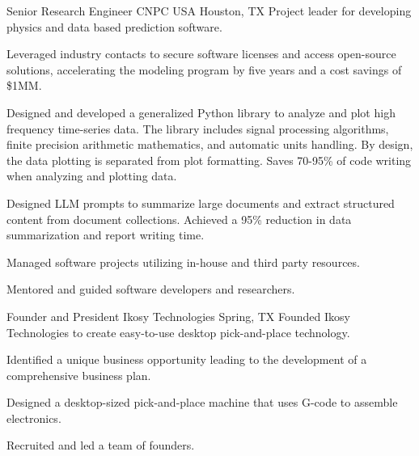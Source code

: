 \documentclass{leresume}
\begin{document}
            {Senior Research Engineer}
            {CNPC USA}
			{Houston, TX}
			Project leader for developing physics and data based prediction software.
		\begin{bulletedlist}
			
		\item
		
				Leveraged industry contacts to secure software licenses and access open-source solutions, accelerating the modeling program by five years and a cost savings of \$1MM.
			
		\item
		
				Designed and developed a generalized Python library to analyze and plot high frequency time-series data.  The library includes signal processing algorithms, 
				finite precision arithmetic mathematics, and automatic units handling. By design, the data plotting is separated from plot formatting.  Saves 70-95\% of code writing when analyzing and plotting data.
			
		\item
		
				Designed LLM prompts to summarize large documents and extract structured content from document collections.  Achieved a 95\% reduction in data summarization and report writing time.
			
		\item
		
				Managed software projects utilizing in-house and third party resources.
			
		\item
		
				Mentored and guided software developers and researchers.
			
		\end{bulletedlist}
	
            {Founder and President}
            {Ikosy Technologies}
			{Spring, TX}
			Founded Ikosy Technologies to create easy-to-use desktop pick-and-place technology.
		\begin{bulletedlist}
			
		\item
		
				Identified a unique business opportunity leading to the development of a comprehensive business plan.
			
		\item
		
				Designed a desktop-sized pick-and-place machine that uses G-code to assemble electronics.
			
		\item
		
				Recruited and led a team of founders.
			
		\end{bulletedlist}
	
\end{document}
